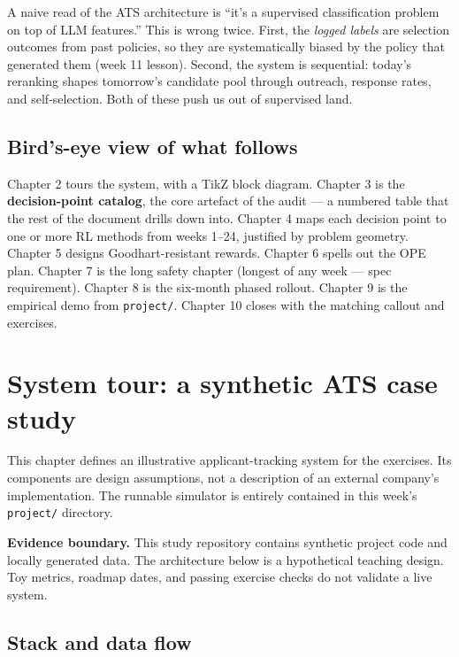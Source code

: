\documentclass[11pt,oneside]{scrbook}
\begin{document}
\begin{pitfall}
A naive read of the ATS architecture is ``it's a supervised classification
problem on top of LLM features.'' This is wrong twice. First, the
\emph{logged labels} are selection outcomes from past policies, so they
are systematically biased by the policy that generated them
(week 11 lesson). Second, the system is sequential: today's reranking
shapes tomorrow's candidate pool through outreach, response rates, and
self-selection. Both of these push us out of supervised land.
\end{pitfall}

\section{Bird's-eye view of what follows}

Chapter 2 tours the system, with a TikZ block diagram. Chapter 3 is the
\textbf{decision-point catalog}, the core artefact of the audit ---
a numbered table that the rest of the document drills down into. Chapter
4 maps each decision point to one or more RL methods from weeks 1--24,
justified by problem geometry. Chapter 5 designs Goodhart-resistant
rewards. Chapter 6 spells out the OPE plan. Chapter 7 is the long
safety chapter (longest of any week --- spec requirement). Chapter 8 is
the six-month phased rollout. Chapter 9 is the empirical demo from
\texttt{project/}. Chapter 10 closes with the matching callout and
exercises.

\chapter{System tour: a synthetic ATS case study}

This chapter defines an illustrative applicant-tracking system for the
exercises. Its components are design assumptions, not a description of an
external company's implementation. The runnable simulator is entirely
contained in this week's \texttt{project/} directory.

\begin{pitfall}
\textbf{Evidence boundary.} This study repository contains synthetic
project code and locally generated data. The architecture below is a
hypothetical teaching design. Toy metrics, roadmap dates, and passing
exercise checks do not validate a live system.
\end{pitfall}

\section{Stack and data flow}
\end{document}
